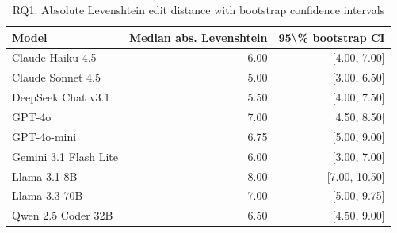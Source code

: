\begin{table}[htbp]
\centering
{\small
\begin{tabular}{l|rr}
\toprule
\textbf{Model} & \textbf{Median abs. Levenshtein} & \textbf{95\textbackslash{}\% bootstrap CI} \\
\midrule
Claude Haiku 4.5 & 6.00 & [4.00, 7.00] \\
Claude Sonnet 4.5 & 5.00 & [3.00, 6.50] \\
DeepSeek Chat v3.1 & 5.50 & [4.00, 7.50] \\
GPT-4o & 7.00 & [4.50, 8.50] \\
GPT-4o-mini & 6.75 & [5.00, 9.00] \\
Gemini 3.1 Flash Lite & 6.00 & [3.00, 7.00] \\
Llama 3.1 8B & 8.00 & [7.00, 10.50] \\
Llama 3.3 70B & 7.00 & [5.00, 9.75] \\
Qwen 2.5 Coder 32B & 6.50 & [4.50, 9.00] \\
\bottomrule
\end{tabular}
}
\caption{RQ1: Absolute Levenshtein edit distance with bootstrap confidence intervals}
\label{tab:rq1-edit-distance}
\end{table}